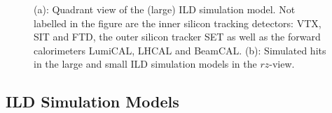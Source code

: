 \begin{figure}[t!]
\begin{subfigure}{0.60\hsize}
    \caption{ \label{fig:sim_hits_LS_rz}}
  \end{subfigure}
  \caption{\label{fig:sim_models}(a): Quadrant view of the (large) ILD simulation model. Not labelled in the figure are the inner
  silicon tracking detectors: VTX, SIT and FTD, the outer silicon tracker SET as well as the forward calorimeters LumiCAL, LHCAL and BeamCAL.
  (b): Simulated hits in the large and small ILD simulation models in the $rz$-view.
  }
\end{figure}



\subsection{\label{sec:det-models} ILD Simulation Models}

